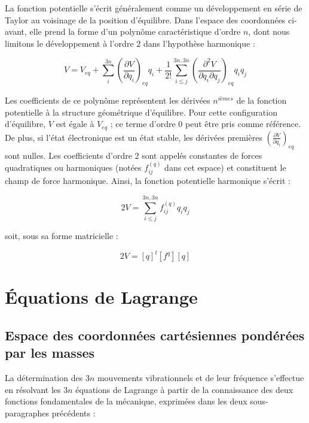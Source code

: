 La fonction potentielle s'écrit généralement comme un développement en série de Taylor au voisinage de la position d'équilibre. Dans l'espace des coordonnées ci-avant, elle prend la forme d'un polynôme caractéristique d'ordre $n$, dont nous limitons le développement à l'ordre 2 dans l'hypothèse harmonique :

\begin{equation}
V = V_{eq} + \sum^{3n}_i\left(\frac{\partial V}{\partial q_i}\right)_{eq} q_i + \frac{1}{2!} \sum^{3n,3n}_{i\leq j}\left(\frac {\partial^2 V}{\partial q_i \partial q_j}\right)_{eq} q_iq_j
\end{equation}

Les coefficients de ce polynôme représentent les dérivées $n^{ièmes}$ de la fonction potentielle à la structure géométrique d'équilibre. Pour cette configuration d'équilibre, $V$ est égale à $V_{eq}$ ; ce terme d'ordre 0 peut être pris comme référence. De plus, si l'état électronique est un état stable, les dérivées premières $\left(\frac{\partial V}{\partial q_i}\right)_{eq}$ sont nulles. Les coefficients d'ordre 2 sont appelés constantes de forces quadratiques ou harmoniques (notées $f^{(q)}_{ij}$ dans cet espace) et constituent le champ de force harmonique.
Ainsi, la fonction potentielle harmonique s'écrit :

\begin{equation}
2V = \sum^{3n,3n}_{i\leq j} f^{(q)}_{ij} q_iq_j
\end{equation}

\noindent soit, sous sa forme matricielle :

\begin{equation}
2V = \left[q\right]^t\left[ f^q\right]\left[q\right]
\end{equation}


\section{Équations de Lagrange}

\subsection{Espace des coordonnées cartésiennes pondérées par les masses}\label{esp_pond_masse}
La détermination des $3n$ mouvements vibrationnels et de leur fréquence s'effectue en résolvant les $3n$ équations de Lagrange à partir de la connaissance des deux fonctions fondamentales de la mécanique, exprimées dans les deux sous-paragraphes précédents :

